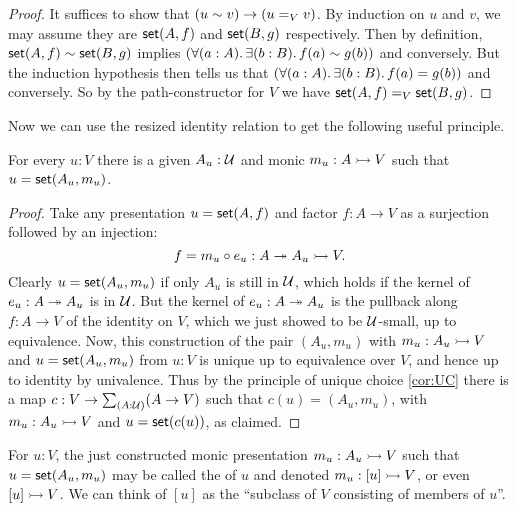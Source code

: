 \begin{proof}
It suffices to show that $(u \sim v)\to (u=_V v)$.
By induction on $u$ and $v$, we may assume they are $\mathsf{set}(A,f)$ and $\mathsf{set}(B,g)$ respectively.
Then by definition, $\mathsf{set}(A,f)\sim\mathsf{set}(B,g)$ implies $(\fall{a:A}\exis{b:B}f(a)  \bisim g(b))$ and conversely.
But the induction hypothesis then tells us that $(\fall{a:A}\exis{b:B}f(a) = g(b))$ and conversely.
So by the path-con\-struc\-tor for $V$ we have $\mathsf{set}(A,f) =_V \mathsf{set}(B,g)$.
\end{proof}

Now we can use the resized identity relation to get the following useful principle.

\begin{lem}\label{lem:MonicSetPresent}
For every $u:V$ there is a given $A_u:\mathcal{U}$ and monic $m_u: A \rightarrowtail V$ such that $u = \mathsf{set}(A_u, m_u)$.
\end{lem}

\begin{proof}
  Take any presentation $u = \mathsf{set}(A,f)$ and factor $f:A\to V$ as a surjection followed by an injection:
  \begin{equation*}
    f = m_u\circ e_u : A \twoheadrightarrow A_u \rightarrowtail V.    
  \end{equation*}
  Clearly $u = \mathsf{set}(A_u, m_u)$ if only $A_u$ is still in $\mathcal{U}$, which holds if the kernel of $e_u : A \twoheadrightarrow A_u$ is in $\mathcal{U}$.  But the kernel of $e_u : A \twoheadrightarrow A_u$ is the pullback along $f : A\to V$ of the identity on $V$, which we just showed to be $\mathcal{U}$-small, up to equivalence.  Now, this construction of the pair $(A_u, m_u)$ with $m_u :A_u \rightarrowtail V$ and $u = \mathsf{set}(A_u, m_u)$ from $u:V$ is unique up to equivalence over $V$, and hence up to identity by univalence.  Thus by the principle of unique choice \eqref{cor:UC} there is a map $c : V\to\sm{A:\UU}(A\to V)$ such that $c(u) = (A_u, m_u)$, with $m_u :A_u \rightarrowtail V$ and $u = \mathsf{set}(c(u))$, as claimed.
\end{proof}

\begin{defn}\label{def:TypeOfElements}
For $u:V$, the just constructed monic presentation $m_u: A_u \rightarrowtail V$ such that $u = \mathsf{set}(A_u, m_u)$ may be called the  of $u$ and denoted $m_u : [u] \rightarrowtail V$, or even $[u] \rightarrowtail V$.  We can think of $[u]$ as the ``subclass of $V$ consisting of members of $u$''.
\end{defn}

